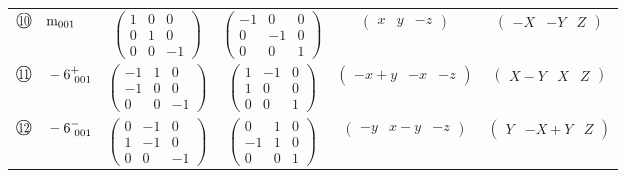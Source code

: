 \documentclass[fleqn,10pt,landscape]{jsarticle}
\begin{document}
\begin{center}
\begin{longtable}{lcccc}
$ {\ooalign{\hfil\resizebox{.8\width}{\height}{10}\hfil\crcr\raise.1ex\hbox{\large$\bigcirc$}}}\quad {\rm m}_{001} $ & $ \begin{pmatrix} 1 & 0 & 0 \\ 0 & 1 & 0 \\ 0 & 0 & -1 \end{pmatrix} $ & $ \begin{pmatrix} -1 & 0 & 0 \\ 0 & -1 & 0 \\ 0 & 0 & 1 \end{pmatrix} $ & $ \begin{pmatrix} x & y & - z \end{pmatrix} $ & $ \begin{pmatrix} - X & - Y & Z \end{pmatrix} $ \\
$ {\ooalign{\hfil\resizebox{.8\width}{\height}{11}\hfil\crcr\raise.1ex\hbox{\large$\bigcirc$}}}\quad -6^{+}_{\,\,001} $ & $ \begin{pmatrix} -1 & 1 & 0 \\ -1 & 0 & 0 \\ 0 & 0 & -1 \end{pmatrix} $ & $ \begin{pmatrix} 1 & -1 & 0 \\ 1 & 0 & 0 \\ 0 & 0 & 1 \end{pmatrix} $ & $ \begin{pmatrix} - x + y & - x & - z \end{pmatrix} $ & $ \begin{pmatrix} X - Y & X & Z \end{pmatrix} $ \\
$ {\ooalign{\hfil\resizebox{.8\width}{\height}{12}\hfil\crcr\raise.1ex\hbox{\large$\bigcirc$}}}\quad -6^{-}_{\,\,001} $ & $ \begin{pmatrix} 0 & -1 & 0 \\ 1 & -1 & 0 \\ 0 & 0 & -1 \end{pmatrix} $ & $ \begin{pmatrix} 0 & 1 & 0 \\ -1 & 1 & 0 \\ 0 & 0 & 1 \end{pmatrix} $ & $ \begin{pmatrix} - y & x - y & - z \end{pmatrix} $ & $ \begin{pmatrix} Y & - X + Y & Z \end{pmatrix} $ \\
\end{longtable}
\end{center}
\end{document}
